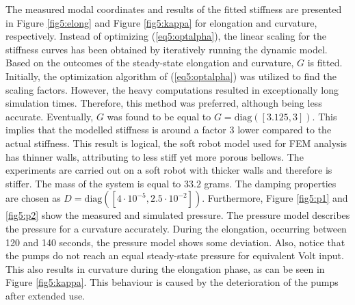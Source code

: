 The measured modal coordinates and results of the fitted stiffness are presented in Figure \ref{fig5:elong} and Figure \ref{fig5:kappa} for elongation and curvature, respectively. Instead of optimizing (\ref{eq5:optalpha}), the linear scaling for the stiffness curves has been obtained by iteratively running the dynamic model. Based on the outcomes of the steady-state elongation and curvature, $G$ is fitted. Initially, the optimization algorithm of (\ref{eq5:optalpha}) was utilized to find the scaling factors. However, the heavy computations resulted in exceptionally long simulation times. Therefore, this method was preferred, although being less accurate. Eventually, $G$ was found to be equal to $G = \text{diag}([3.125,3])$. This implies that the modelled stiffness is around a factor 3 lower compared to the actual stiffness. This result is logical, the soft robot model used for FEM analysis has thinner walls, attributing to less stiff yet more porous bellows. The experiments are carried out on a soft robot with thicker walls and therefore is stiffer. The mass of the system is equal to $33.2$ grams. The damping properties are chosen as $D = \text{diag}([4\cdot 10^{-5},2.5\cdot 10^{-2}])$. Furthermore, Figure \ref{fig5:p1} and \ref{fig5:p2} show the measured and simulated pressure. The pressure model describes the pressure for a curvature accurately. During the elongation, occurring between 120 and 140 seconds, the pressure model shows some deviation. Also, notice that the pumps do not reach an equal steady-state pressure for equivalent Volt input. This also results in curvature during the elongation phase, as can be seen in Figure \ref{fig5:kappa}. This behaviour is caused by the deterioration of the pumps after extended use. 


